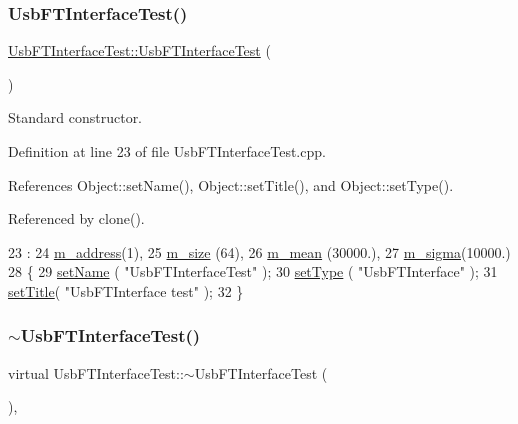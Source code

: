 \subsubsection{\texorpdfstring{Usb\+F\+T\+Interface\+Test()}{UsbFTInterfaceTest()}}
{\footnotesize\ttfamily \hyperlink{classUsbFTInterfaceTest_1_1UsbFTInterfaceTest}{Usb\+F\+T\+Interface\+Test\+::\+Usb\+F\+T\+Interface\+Test} (\begin{DoxyParamCaption}{ }\end{DoxyParamCaption})}



Standard constructor. 



Definition at line 23 of file Usb\+F\+T\+Interface\+Test.\+cpp.



References Object\+::set\+Name(), Object\+::set\+Title(), and Object\+::set\+Type().



Referenced by clone().


\begin{DoxyCode}
23                                          :
24   \hyperlink{classUsbFTInterfaceTest_afab3cfd8e2bba2621583f0631471ef12}{m\_address}(1),
25   \hyperlink{classUsbFTInterfaceTest_a9028dd3c7f3533870d7c1f264a1ec1b4}{m\_size} (64),
26   \hyperlink{classUsbFTInterfaceTest_a88bd9de98a903663a21e03368aa567fc}{m\_mean} (30000.),
27   \hyperlink{classUsbFTInterfaceTest_a968e22a659f423b04c32a45d6d3160ea}{m\_sigma}(10000.)
28   \{
29   \hyperlink{classObject_ae30fea75683c2d149b6b6d17c09ecd0c}{setName} ( \textcolor{stringliteral}{"UsbFTInterfaceTest"} );
30   \hyperlink{classObject_aae534cc9d982bcb9b99fd505f2e103a5}{setType} ( \textcolor{stringliteral}{"UsbFTInterface"} );
31   \hyperlink{classObject_a89557dbbad5bcaa02652f5d7fa35d20f}{setTitle}( \textcolor{stringliteral}{"UsbFTInterface test"} );
32 \}
\end{DoxyCode}
\mbox{\label{classUsbFTInterfaceTest_a9ae091e623e181994ff8ef8ec7155a14}} 
\subsubsection{\texorpdfstring{$\sim$\+Usb\+F\+T\+Interface\+Test()}{~UsbFTInterfaceTest()}}
{\footnotesize\ttfamily virtual Usb\+F\+T\+Interface\+Test\+::$\sim$\+Usb\+F\+T\+Interface\+Test (\begin{DoxyParamCaption}{ }\end{DoxyParamCaption})\hspace{0.3cm}{\ttfamily [inline]}, {\ttfamily [virtual]}}



